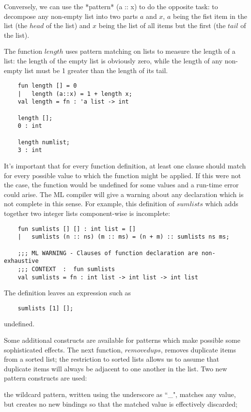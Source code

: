 Conversely, we can use the *pattern* (a :: x) to do the opposite task: to
decompose any non-empty list into two parts $a$ and $x$, $a$ being the
fist item in the list (the $head$ of the list) and $x$ being the list of
all items but the first (the $tail$ of the list).

The function $length$ uses pattern matching on lists to measure the
length of a list: the length of the empty list is obviously zero, while
the length of any non-empty list must be 1 greater than the length of
its tail.
\begin{verbatim}
    fun length [] = 0
    |   length (a::x) = 1 + length x;
    val length = fn : 'a list -> int

    length [];
    0 : int

    length numlist;
    3 : int
\end{verbatim}

It's important that for every function definition, at least one clause
should match for every possible value to which the function might be
applied. If this were not the case, the function would be undefined for
some values and a run-time error could arise. The ML compiler will give
a warning about any declaration which is not complete in this sense. For
example, this definition of $sumlists$ which adds together two integer
lists component-wise is incomplete:
\begin{verbatim}
    fun sumlists [] [] : int list = []
    |   sumlists (n :: ns) (m :: ms) = (n + m) :: sumlists ns ms;

    ;;; ML WARNING - Clauses of function declaration are non-exhaustive
    ;;; CONTEXT  :  fun sumlists
    val sumlists = fn : int list -> int list -> int list
\end{verbatim}

The definition leaves an expression such as
\begin{verbatim}
    sumlists [1] [];
\end{verbatim}

undefined.

Some additional constructs are available for patterns which make
possible some sophisticated effects. The next function, $removedups$,
removes duplicate items from a sorted list; the restriction to sorted
lists allows us to assume that duplicate items will always be adjacent
to one another in the list. Two new pattern constructs are used:

    the wildcard pattern, written using the underscore as ``\_",
matches any value, but creates no
        new bindings so that the matched value is effectively discarded;


